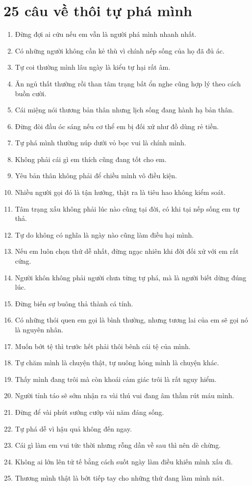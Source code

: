 \section{25 câu về thôi tự phá mình}
\begin{enumerate}[leftmargin=*,resume]
\item Đừng đợi ai cứu nếu em vẫn là người phá mình nhanh nhất.
\item Có những người không cần kẻ thù vì chính nếp sống của họ đã đủ ác.
\item Tự coi thường mình lâu ngày là kiểu tự hại rất âm.
\item Ăn ngủ thất thường rồi than tâm trạng bất ổn nghe cũng hợp lý theo cách buồn cười.
\item Cái miệng nói thương bản thân nhưng lịch sống đang hành hạ bản thân.
\item Đừng đòi đầu óc sáng nếu cơ thể em bị đối xử như đồ dùng rẻ tiền.
\item Tự phá mình thường núp dưới vỏ bọc vui là chính mình.
\item Không phải cái gì em thích cũng đang tốt cho em.
\item Yêu bản thân không phải để chiều mình vô điều kiện.
\item Nhiều người gọi đó là tận hưởng, thật ra là tiêu hao không kiểm soát.
\item Tâm trạng xấu không phải lúc nào cũng tại đời, có khi tại nếp sống em tự thả.
\item Tự do không có nghĩa là ngày nào cũng làm điều hại mình.
\item Nếu em luôn chọn thứ dễ nhất, đừng ngạc nhiên khi đời đối xử với em rất cứng.
\item Người khôn không phải người chưa từng tự phá, mà là người biết dừng đúng lúc.
\item Đừng biến sự buông thả thành cá tính.
\item Có những thói quen em gọi là bình thường, nhưng tương lai của em sẽ gọi nó là nguyên nhân.
\item Muốn bớt tệ thì trước hết phải thôi bênh cái tệ của mình.
\item Tự chăm mình là chuyện thật, tự nuông hỏng mình là chuyện khác.
\item Thấy mình đang trôi mà còn khoái cảm giác trôi là rất nguy hiểm.
\item Người tỉnh táo sẽ sớm nhận ra vài thú vui đang âm thầm rút máu mình.
\item Đừng để vài phút sướng cướp vài năm đáng sống.
\item Tự phá dễ vì hậu quả không đến ngay.
\item Cái gì làm em vui tức thời nhưng rỗng dần về sau thì nên dè chừng.
\item Không ai lớn lên tử tế bằng cách suốt ngày làm điều khiến mình xấu đi.
\item Thương mình thật là bớt tiếp tay cho những thứ đang làm mình nát.
\end{enumerate}

